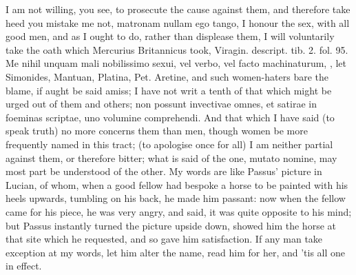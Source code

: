 I am not willing, you see, to prosecute the cause against them, and
therefore take heed you mistake me not, matronam nullam ego
tango, I honour the sex, with all good men, and as I ought to do,
rather than displease them, I will voluntarily take the oath which
Mercurius Britannicus took, Viragin. descript. tib. 2. fol. 95. Me
nihil unquam mali nobilissimo sexui, vel verbo, vel facto machinaturum,
\etc{}, let Simonides, Mantuan, Platina, Pet. Aretine, and such
women-haters bare the blame, if aught be said amiss; I have not writ a
tenth of that which might be urged out of them and others; non
possunt invectivae omnes, et satirae in foeminas scriptae, uno volumine
comprehendi. And that which I have said (to speak truth) no more
concerns them than men, though women be more frequently named in this
tract; (to apologise once for all) I am neither partial against them,
or therefore bitter; what is said of the one, mutato nomine, may most
part be understood of the other. My words are like Passus' picture in
Lucian, of whom, when a good fellow had bespoke a horse to be
painted with his heels upwards, tumbling on his back, he made him
passant: now when the fellow came for his piece, he was very angry, and
said, it was quite opposite to his mind; but Passus instantly turned
the picture upside down, showed him the horse at that site which he
requested, and so gave him satisfaction. If any man take exception at
my words, let him alter the name, read him for her, and 'tis all one in
effect.

